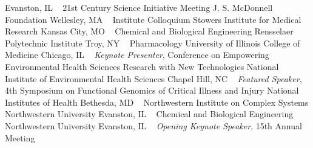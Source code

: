 Evanston, IL
\newline
~
\Gap
{}
21st Century Science Initiative Meeting
\newline
    J. S. McDonnell Foundation
    \newline
Wellesley, MA
\newline
~
\Gap
{}
Institute Colloquium
\newline
    Stowers Institute for Medical Research
    \newline
Kansas City, MO
\newline
~
\Gap
{}
Chemical and Biological Engineering
\newline
    Rensselaer Polytechnic Institute
    \newline
Troy, NY
\newline
~
\Gap
{}
Pharmacology
\newline
    University of Illinois College of Medicine
    \newline
Chicago, IL
\newline
~
\Gap
{}
\textit{Keynote Presenter}, Conference on Empowering Environmental Health Sciences Research with New Technologies
\newline
    National Institute of Environmental Health Sciences
    \newline
Chapel Hill, NC
\newline
~
\Gap
{}
\textit{Featured Speaker}, 4th Symposium on Functional Genomics of Critical Illness and Injury
\newline
    National Institutes of Health
    \newline
Bethesda, MD
\newline
~
\Gap
{}
Northwestern Institute on Complex Systems
\newline
    Northwestern University
    \newline
Evanston, IL
\newline
~
\Gap
{}
Chemical and Biological Engineering
\newline
    Northwestern University
    \newline
Evanston, IL
\newline
~
\Gap
{}
\textit{Opening Keynote Speaker}, 15th Annual Meeting 
